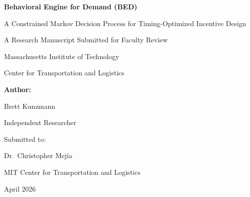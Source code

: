 \documentclass[12pt,twoside]{mitthesis}
\begin{document}

\begin{titlepage}
    \centering
    \vspace*{1in}

    {\Huge \textbf{Behavioral Engine for Demand (BED)}\par}
    \vspace{0.4cm}
    {\Large A Constrained Markov Decision Process for Timing-Optimized Incentive Design\par}

    \vspace{1.5in}

    {\Large A Research Manuscript Submitted for Faculty Review\par}
    {\Large Massachusetts Institute of Technology\par}
    {\Large Center for Transportation and Logistics\par}

    \vspace{1.2in}

    {\Large \textbf{Author:}\par}
    {\Large Brett Kunzmann\par}
    {\large Independent Researcher\par}

    \vfill

    {\large Submitted to:\par}
    {\large Dr.\ Christopher Mejía\par}
    {\large MIT Center for Transportation and Logistics\par}

    \vspace{0.8in}

    {\large April 2026\par}

\end{titlepage}







\end{document}
